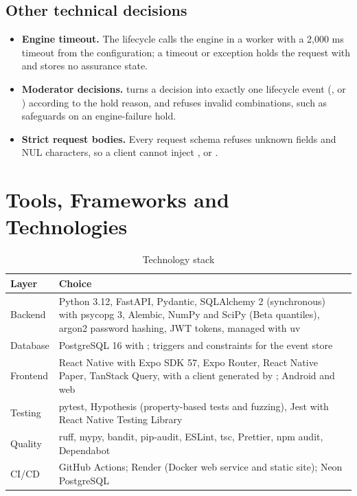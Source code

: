 \subsection{Other technical decisions}\label{sec:other-technical-decisions}
\begin{itemize}
\item \textbf{Engine timeout.} The lifecycle calls the engine in a worker with a 2,000 ms timeout from the configuration; a timeout or exception holds the request with  and stores no assurance state.
\item \textbf{Moderator decisions.}  turns a decision into exactly one lifecycle event (,  or ) according to the hold reason, and refuses invalid combinations, such as safeguards on an engine-failure hold.
\item \textbf{Strict request bodies.} Every request schema refuses unknown fields and NUL characters, so a client cannot inject ,  or .
\end{itemize}

\section{Tools, Frameworks and Technologies}\label{sec:tools-frameworks-technologies}
\begin{table}[H]
\centering
\caption{Technology stack}\label{tab:technology-stack}
\begin{tabular}{@{}L{90pt}L{289pt}@{}}
\toprule
Layer & Choice \\
\midrule
Backend & Python 3.12, FastAPI, Pydantic, SQLAlchemy 2 (synchronous) with psycopg 3, Alembic, NumPy and SciPy (Beta quantiles), argon2 password hashing, JWT tokens, managed with uv \\
Database & PostgreSQL 16 with ; triggers and constraints for the event store \\
Frontend & React Native with Expo SDK 57, Expo Router, React Native Paper, TanStack Query,  with a client generated by ; Android and web \\
Testing & pytest, Hypothesis (property-based tests and fuzzing), Jest with React Native Testing Library \\
Quality & ruff, mypy, bandit, pip-audit, ESLint, tsc, Prettier, npm audit, Dependabot \\
CI/CD & GitHub Actions; Render (Docker web service and static site); Neon PostgreSQL \\
\bottomrule
\end{tabular}
\end{table}
